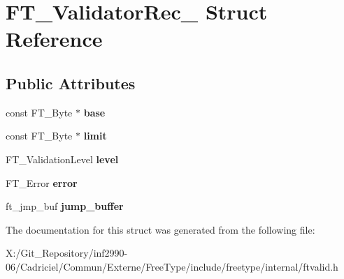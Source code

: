 \hypertarget{struct_f_t___validator_rec__}{\section{F\-T\-\_\-\-Validator\-Rec\-\_\- Struct Reference}
\label{struct_f_t___validator_rec__}
}
\subsection*{Public Attributes}
\begin{DoxyCompactItemize}
\item 
\hypertarget{struct_f_t___validator_rec___a62de459b75acae3e1695b3d6600ca22f}{const F\-T\-\_\-\-Byte $\ast$ {\bfseries base}}\label{struct_f_t___validator_rec___a62de459b75acae3e1695b3d6600ca22f}

\item 
\hypertarget{struct_f_t___validator_rec___acc4d58a3e46d2b7c92bb51c3ddd8d331}{const F\-T\-\_\-\-Byte $\ast$ {\bfseries limit}}\label{struct_f_t___validator_rec___acc4d58a3e46d2b7c92bb51c3ddd8d331}

\item 
\hypertarget{struct_f_t___validator_rec___aa70830280c76507b8b06e616da8cb545}{F\-T\-\_\-\-Validation\-Level {\bfseries level}}\label{struct_f_t___validator_rec___aa70830280c76507b8b06e616da8cb545}

\item 
\hypertarget{struct_f_t___validator_rec___ab12d54f54a55a90ce19761a1c24e28f0}{F\-T\-\_\-\-Error {\bfseries error}}\label{struct_f_t___validator_rec___ab12d54f54a55a90ce19761a1c24e28f0}

\item 
\hypertarget{struct_f_t___validator_rec___aa0b346f9ef78939e93c85389aa2b54b3}{ft\-\_\-jmp\-\_\-buf {\bfseries jump\-\_\-buffer}}\label{struct_f_t___validator_rec___aa0b346f9ef78939e93c85389aa2b54b3}

\end{DoxyCompactItemize}


The documentation for this struct was generated from the following file\-:\begin{DoxyCompactItemize}
\item 
X\-:/\-Git\-\_\-\-Repository/inf2990-\/06/\-Cadriciel/\-Commun/\-Externe/\-Free\-Type/include/freetype/internal/ftvalid.\-h\end{DoxyCompactItemize}
